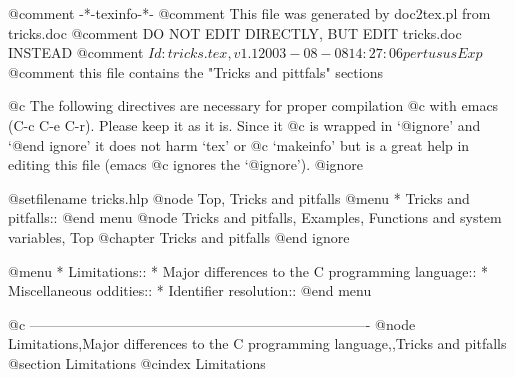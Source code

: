 @comment -*-texinfo-*-
@comment This file was generated by doc2tex.pl from tricks.doc
@comment DO NOT EDIT DIRECTLY, BUT EDIT tricks.doc INSTEAD
@comment $Id: tricks.tex,v 1.1 2003-08-08 14:27:06 pertusus Exp $
@comment this file contains the "Tricks and pittfals" sections

@c The following directives are necessary for proper compilation
@c with emacs (C-c C-e C-r).  Please keep it as it is.  Since it
@c is wrapped in `@ignore' and `@end ignore' it does not harm `tex' or
@c `makeinfo' but is a great help in editing this file (emacs
@c ignores the `@ignore').
@ignore

@setfilename tricks.hlp
@node Top, Tricks and pitfalls
@menu
* Tricks and pitfalls::
@end menu
@node Tricks and pitfalls, Examples, Functions and system variables, Top
@chapter Tricks and pitfalls
@end ignore

@menu
* Limitations::
* Major differences to the C programming language::
* Miscellaneous oddities::
* Identifier resolution::
@end menu

@c -------------------------------------------------------------------------
@node Limitations,Major differences to the C programming language,,Tricks and pitfalls
@section Limitations
@cindex Limitations

